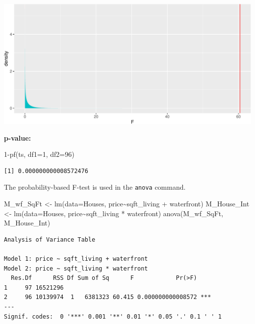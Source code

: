 \documentclass[
  letterpaper,
  DIV=11,
  numbers=noendperiod]{scrreprt}
\newenvironment{Shaded}{\begin{snugshade}}{\end{snugshade}}
\newcommand{\AttributeTok}[1]{\textcolor[rgb]{0.40,0.45,0.13}{#1}}
\newcommand{\DecValTok}[1]{\textcolor[rgb]{0.68,0.00,0.00}{#1}}
\newcommand{\FunctionTok}[1]{\textcolor[rgb]{0.28,0.35,0.67}{#1}}
\newcommand{\NormalTok}[1]{\textcolor[rgb]{0.00,0.23,0.31}{#1}}
\newcommand{\OtherTok}[1]{\textcolor[rgb]{0.00,0.23,0.31}{#1}}
\newcommand{\SpecialCharTok}[1]{\textcolor[rgb]{0.37,0.37,0.37}{#1}}
\begin{document}
\includegraphics{Ch4_files/figure-pdf/unnamed-chunk-53-1.pdf}

\textbf{p-value:}

\begin{Shaded}
\begin{Highlighting}[]
\DecValTok{1}\SpecialCharTok{{-}}\FunctionTok{pf}\NormalTok{(ts, }\AttributeTok{df1=}\DecValTok{1}\NormalTok{, }\AttributeTok{df2=}\DecValTok{96}\NormalTok{)}
\end{Highlighting}
\end{Shaded}

\begin{verbatim}
[1] 0.000000000008572476
\end{verbatim}

The probability-based F-test is used in the \texttt{anova} command.

\begin{Shaded}
\begin{Highlighting}[]
\NormalTok{M\_wf\_SqFt }\OtherTok{\textless{}{-}} \FunctionTok{lm}\NormalTok{(}\AttributeTok{data=}\NormalTok{Houses, price}\SpecialCharTok{\textasciitilde{}}\NormalTok{sqft\_living }\SpecialCharTok{+}\NormalTok{ waterfront)}
\NormalTok{M\_House\_Int }\OtherTok{\textless{}{-}} \FunctionTok{lm}\NormalTok{(}\AttributeTok{data=}\NormalTok{Houses, price}\SpecialCharTok{\textasciitilde{}}\NormalTok{sqft\_living }\SpecialCharTok{*}\NormalTok{ waterfront)}
\FunctionTok{anova}\NormalTok{(M\_wf\_SqFt, M\_House\_Int)}
\end{Highlighting}
\end{Shaded}

\begin{verbatim}
Analysis of Variance Table

Model 1: price ~ sqft_living + waterfront
Model 2: price ~ sqft_living * waterfront
  Res.Df      RSS Df Sum of Sq      F            Pr(>F)    
1     97 16521296                                          
2     96 10139974  1   6381323 60.415 0.000000000008572 ***
---
Signif. codes:  0 '***' 0.001 '**' 0.01 '*' 0.05 '.' 0.1 ' ' 1
\end{verbatim}
\end{document}
